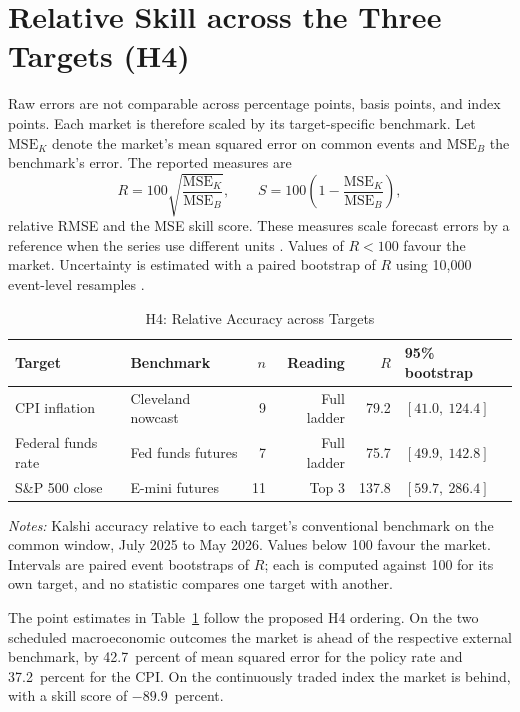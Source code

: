 \documentclass[12pt,a4paper]{report}
\newcommand{\tablenote}[1]{%
  \par\vspace{0.4em}%
  \begin{minipage}{0.9\textwidth}%
  \footnotesize\raggedright\emph{Notes:} #1%
  \end{minipage}%
}
\begin{document}
\section{Relative Skill across the Three Targets (H4)}
\label{sec:h4}

Raw errors are not comparable across percentage points, basis points, and
index points. Each market is therefore scaled by its target-specific benchmark.
Let $\mathrm{MSE}_K$ denote the market's mean squared error on common events
and $\mathrm{MSE}_B$ the benchmark's error. The reported measures are
\begin{equation}
R = 100\sqrt{\frac{\mathrm{MSE}_K}{\mathrm{MSE}_B}},
\qquad
S = 100\left(1 - \frac{\mathrm{MSE}_K}{\mathrm{MSE}_B}\right),
\label{eq:relskill}
\end{equation}
relative RMSE and the MSE skill score. These measures scale forecast errors by
a reference when the series use different units
\parencite{hyndman2006,murphy1988}. Values
of $R < 100$ favour the market. Uncertainty is estimated with a paired bootstrap
of $R$ using 10{,}000 event-level resamples \parencite{efron1979}.

\begin{table}[htbp]
\centering
\caption{H4: Relative Accuracy across Targets}
\label{tab:h4}
\small
\begin{tabular}{@{}llrrrl@{}}
\toprule
Target & Benchmark & $n$ & Reading & $R$ & 95\% bootstrap \\
\midrule
CPI inflation & Cleveland nowcast & 9 & Full ladder & 79.2 & $[41.0,\ 124.4]$ \\
Federal funds rate & Fed funds futures & 7 & Full ladder & 75.7 & $[49.9,\ 142.8]$ \\
S\&P 500 close & E-mini futures & 11 & Top 3 & 137.8 & $[59.7,\ 286.4]$ \\
\bottomrule
\end{tabular}
\tablenote{Kalshi accuracy relative to each target's conventional benchmark
on the common window, July 2025 to May 2026. Values below 100 favour the
market. Intervals are paired event bootstraps of $R$; each is computed against
100 for its own target, and no statistic compares one target with another.}
\end{table}

The point estimates in Table~\ref{tab:h4} follow the proposed H4 ordering. On the two scheduled
macroeconomic outcomes the market is ahead of the respective external benchmark, by 42.7~percent of mean
squared error for the policy rate and 37.2~percent for the CPI. On the
continuously traded index the market is behind, with a skill score of $-89.9$~percent.
\end{document}
